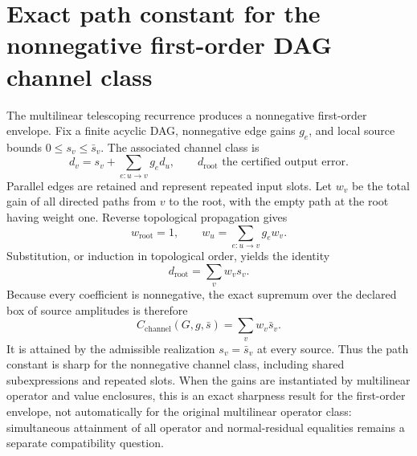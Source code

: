 \section{Exact path constant for the nonnegative first-order DAG channel class}
\label{sec:exact-dag-path-constant}

The multilinear telescoping recurrence produces a nonnegative first-order
envelope.  Fix a finite acyclic DAG, nonnegative edge gains $g_e$, and local
source bounds $0\le s_v\le\bar s_v$.  The associated channel class is
\begin{equation*}
 d_v=s_v+\sum_{e:u\to v}g_e d_u,
 \qquad d_{\mathrm{root}}\text{ the certified output error}.
\end{equation*}
Parallel edges are retained and represent repeated input slots.  Let $w_v$ be
the total gain of all directed paths from $v$ to the root, with the empty path
at the root having weight one.  Reverse topological propagation gives
\begin{equation*}
 w_{\mathrm{root}}=1,
 \qquad
 w_u=\sum_{e:u\to v}g_e w_v.
\end{equation*}
Substitution, or induction in topological order, yields the identity
\begin{equation*}
 d_{\mathrm{root}}=\sum_v w_v s_v.
\end{equation*}
Because every coefficient is nonnegative, the exact supremum over the declared
box of source amplitudes is therefore
\begin{equation*}
 C_{\mathrm{channel}}(G,g,\bar s)
   =\sum_v w_v\bar s_v.
\end{equation*}
It is attained by the admissible realization $s_v=\bar s_v$ at every source.
Thus the path constant is sharp for the nonnegative channel class, including
shared subexpressions and repeated slots.  When the gains are instantiated by
multilinear operator and value enclosures, this is an exact sharpness result
for the first-order envelope, not automatically for the original multilinear
operator class: simultaneous attainment of all operator and normal-residual
equalities remains a separate compatibility question.


